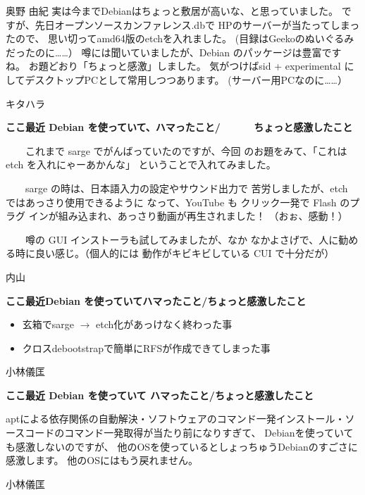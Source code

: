 \documentclass[cjk,dvipdfmx,12pt]{beamer}
\begin{document}
\begin{frame}{奥野 由紀}
実は今までDebianはちょっと敷居が高いな、と思っていました。
ですが、先日オープンソースカンファレンス.dbで
HPのサーバーが当たってしまったので、
思い切ってamd64版のetchを入れました。
(目録はGeekoのぬいぐるみだったのに……）
噂には聞いていましたが、Debian のパッケージは豊富ですね。
お題どおり「ちょっと感激」しました。
気がつけばsid + experimental にしてデスクトップPCとして常用しつつあります。
(サーバー用PCなのに……）

\end{frame}\begin{frame}{キタハラ}

\textbf{ここ最近 Debian を使っていて、ハマったこと/
　　　ちょっと感激したこと}

　　これまで sarge でがんばっていたのですが、今回
のお題をみて、「これは etch を入れにゃーあかんな」
ということで入れてみました。

　　sarge の時は、日本語入力の設定やサウンド出力で
苦労しましたが、etch ではあっさり使用できるように
なって、YouTube も クリック一発で Flash のプラグ
インが組み込まれ、あっさり動画が再生されました！
（おぉ、感動！）

　　噂の GUI インストーラも試してみましたが、なか
なかよさげで、人に勧める時に良い感じ。（個人的には
動作がキビキビしている CUI で十分だが）

\end{frame}\begin{frame}{内山}

\textbf{ここ最近Debian を使っていてハマったこと/ちょっと感激したこと}

\begin{itemize}
 \item 玄箱でsarge $\rightarrow$ etch化があっけなく終わった事
 \item クロスdebootstrapで簡単にRFSが作成できてしまった事
\end{itemize}

\end{frame}\begin{frame}{小林儀匡}

\textbf{ここ最近 Debian を使っていて ハマったこと/ちょっと感激したこと}

aptによる依存関係の自動解決・ソフトウェアのコマンド一発インストール・ソースコードのコマンド一発取得が当たり前になりすぎて、
Debianを使っていても感激しないのですが、
他のOSを使っているとしょっちゅうDebianのすごさに感激します。
他のOSにはもう戻れません。

\end{frame}\begin{frame}{小林儀匡}


\end{frame}
\end{document}
